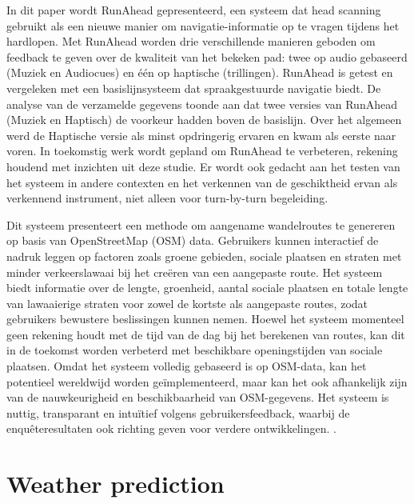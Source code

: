     \break

    \textcite{Gallo2020} 
    In dit paper wordt RunAhead gepresenteerd, 
    een systeem dat head scanning gebruikt als een nieuwe manier om navigatie-informatie op te vragen tijdens het hardlopen. 
    Met RunAhead worden drie verschillende manieren geboden om feedback te geven over de kwaliteit van het bekeken pad: 
    twee op audio gebaseerd (Muziek en Audiocues) en één op haptische (trillingen). 
    RunAhead is getest en vergeleken met een basislijnsysteem dat spraakgestuurde navigatie biedt. 
    De analyse van de verzamelde gegevens toonde aan dat twee versies van RunAhead (Muziek en Haptisch) de voorkeur hadden boven de basislijn. 
    Over het algemeen werd de Haptische versie als minst opdringerig ervaren en kwam als eerste naar voren. 
    In toekomstig werk wordt gepland om RunAhead te verbeteren, rekening houdend met inzichten uit deze studie. 
    Er wordt ook gedacht aan het testen van het systeem in andere contexten en het verkennen van de geschiktheid ervan als verkennend instrument, 
    niet alleen voor turn-by-turn begeleiding.

    \break

    \textcite{Novack2018} 
    Dit systeem presenteert een methode om aangename wandelroutes te genereren op basis van OpenStreetMap (OSM) data. 
    Gebruikers kunnen interactief de nadruk leggen op factoren zoals groene gebieden, 
    sociale plaatsen en straten met minder verkeerslawaai bij het creëren van een aangepaste route. 
    Het systeem biedt informatie over de lengte, groenheid, aantal sociale plaatsen en totale lengte van lawaaierige straten 
    voor zowel de kortste als aangepaste routes, zodat gebruikers bewustere beslissingen kunnen nemen. 
    Hoewel het systeem momenteel geen rekening houdt met de tijd van de dag bij het berekenen van routes, 
    kan dit in de toekomst worden verbeterd met beschikbare openingstijden van sociale plaatsen. 
    Omdat het systeem volledig gebaseerd is op OSM-data, kan het potentieel wereldwijd worden geïmplementeerd, 
    maar kan het ook afhankelijk zijn van de nauwkeurigheid en beschikbaarheid van OSM-gegevens. 
    Het systeem is nuttig, transparant en intuïtief volgens gebruikersfeedback, 
    waarbij de enquêteresultaten ook richting geven voor verdere ontwikkelingen.
    \autocite{Novack2018}.

    \section{Weather prediction}

